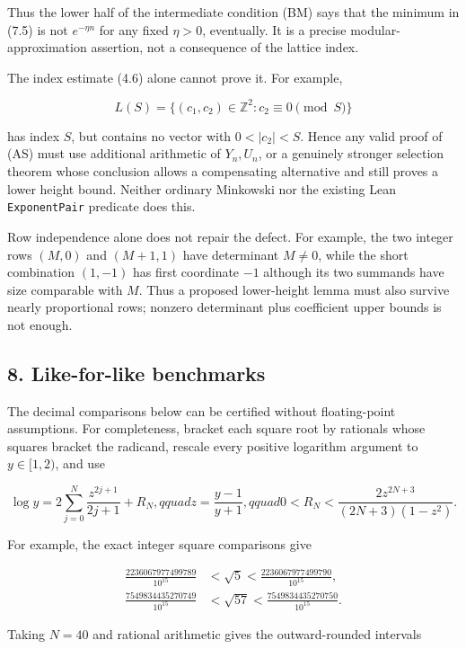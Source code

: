 \documentclass[
  11pt,
]{article}
\begin{document}
Thus the lower half of the intermediate condition (BM) says that the
minimum in (7.5) is not \(e^{-\eta n}\) for any fixed \(\eta>0\),
eventually. It is a precise modular-approximation assertion, not a
consequence of the lattice index.

The index estimate (4.6) alone cannot prove it. For example,

\[
 L(S)=\{(c_1,c_2)\in\mathbb Z^2:c_2\equiv0\pmod S\}
\]

has index \(S\), but contains no vector with \(0<|c_2|<S\). Hence any
valid proof of (AS) must use additional arithmetic of \(Y_n,U_n\), or a
genuinely stronger selection theorem whose conclusion allows a
compensating alternative and still proves a lower height bound. Neither
ordinary Minkowski nor the existing Lean \texttt{ExponentPair} predicate
does this.

Row independence alone does not repair the defect. For example, the two
integer rows \((M,0)\) and \((M+1,1)\) have determinant \(M\ne0\), while
the short combination \((1,-1)\) has first coordinate \(-1\) although
its two summands have size comparable with \(M\). Thus a proposed
lower-height lemma must also survive nearly proportional rows; nonzero
determinant plus coefficient upper bounds is not enough.

\hypertarget{like-for-like-benchmarks}{%
\subsection{8. Like-for-like
benchmarks}\label{like-for-like-benchmarks}}

The decimal comparisons below can be certified without floating-point
assumptions. For completeness, bracket each square root by rationals
whose squares bracket the radicand, rescale every positive logarithm
argument to \(y\in[1,2)\), and use

\[
 \log y=2\sum_{j=0}^{N}\frac{z^{2j+1}}{2j+1}+R_N,qquad
 z=\frac{y-1}{y+1},qquad
 0<R_N<\frac{2z^{2N+3}}{(2N+3)(1-z^2)}.             \tag{8.1}
\]

For example, the exact integer square comparisons give

\[
 \begin{aligned}
 \frac{2236067977499789}{10^{15}}&<\sqrt5<
 \frac{2236067977499790}{10^{15}},\\
 \frac{7549834435270749}{10^{15}}&<\sqrt{57}<
 \frac{7549834435270750}{10^{15}}.
 \end{aligned}
\]

Taking \(N=40\) and rational arithmetic gives the outward-rounded
intervals
\end{document}
